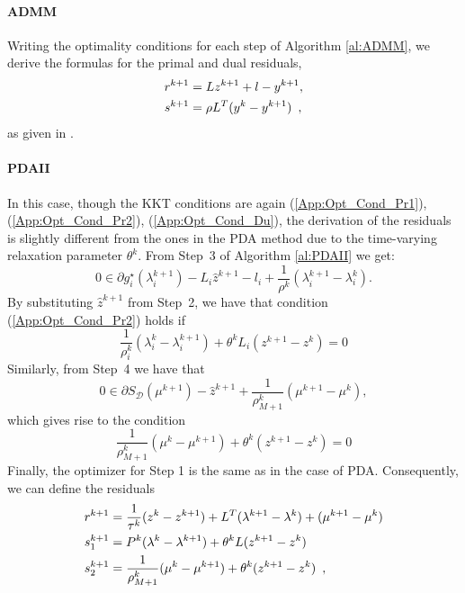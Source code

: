 \documentclass[openany]{now}
\begin{document}
\paragraph{ADMM} 
Writing the optimality conditions for each step of Algorithm \ref{al:ADMM}, we derive the formulas for the primal and dual residuals, 
\begin{align}{\label{app:res:admm}}
r^{k+1} &= Lz^{k+1}+l-y^{k+1}, \\
s^{k+1} &= \rho L^T(y^k-y^{k+1})\enspace,
\end{align}
as given in \cite{admm_distr_stats}. 

\iffalse
\paragraph{PDAII} In this case, though the KKT conditions are again (\ref{App:Opt_Cond_Pr1}), (\ref{App:Opt_Cond_Pr2}), (\ref{App:Opt_Cond_Du}), the derivation of the residuals is slightly different from the ones in the PDA method due to the time-varying relaxation parameter $\theta^k$. From Step~3 of Algorithm \ref{al:PDAII} we get:
\[
0\in\partial g_i^{\star}(\lambda_i^{k+1}) - L_i\hat{z}^{k+1} - l_i + \frac{1}{\rho^k}(\lambda_i^{k+1}-\lambda_i^k).
\]
By substituting $\hat{z}^{k+1}$ from Step~2, we have that condition (\ref{App:Opt_Cond_Pr2}) holds if
\[
 \frac{1}{\rho_i^k}(\lambda_i^k-\lambda_i^{k+1}) + \theta^k L_i(z^{k+1}-z^k) = 0
\]
 Similarly, from Step~4 we have that 
\[
 0\in\partial S_\mathcal{D}(\mu^{k+1})-\hat{z}^{k+1}+\frac{1}{\rho_{M+1}^k}(\mu^{k+1}-\mu^k),
\]
which gives rise to the condition
\[
\frac{1}{\rho_{M+1}^k}(\mu^k-\mu^{k+1}) + \theta^k (z^{k+1}-z^k) = 0
\]
Finally, the optimizer for Step 1 is the same as in the case of PDA.
Consequently, we can define the residuals
\begin{align}{\label{app:res:pdaII}}
 r^{k+1} &= \frac{1}{\tau^k}(z^k-z^{k+1}) + L^T(\lambda^{k+1}-\lambda^k) + (\mu^{k+1}-\mu^k) \\
 s_1^{k+1} &= P^{k}(\lambda^k-\lambda^{k+1}) + \theta^k L(z^{k+1}-z^k) \\
 s_2^{k+1} &= \frac{1}{\rho^k_{M+1}}(\mu^k-\mu^{k+1}) + \theta^k(z^{k+1}-z^k)\enspace,
\end{align}
\end{document}
